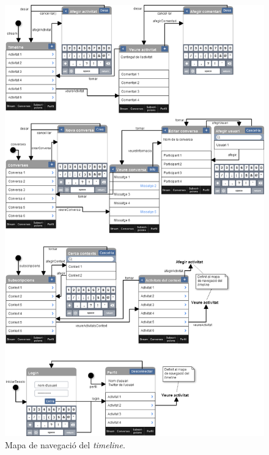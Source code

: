 \begin{figure}[ht]
    \centering
    \includegraphics*[scale=0.5,viewport=0 1200 860 1630]{Memoria/Arquitectura/Projecte/Presentacio/mapa_de_navegacio.png}
    \caption{Mapa de navegació del \textit{timeline}.}
    \label{fig:mapa_nav_timeline}
\end{figure}
\FloatBarrier

